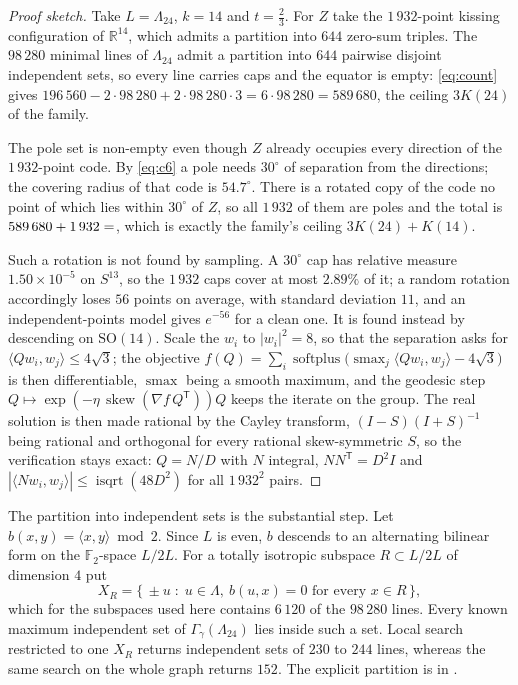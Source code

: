 \documentclass[11pt]{amsart}
\theoremstyle{remark}
\newcommand{\Leech}{\Lambda_{24}}
\newcommand{\ip}[2]{\langle #1,#2\rangle}
\newcommand{\R}{\mathbb{R}}
\begin{document}
\begin{proof}[Proof sketch]
Take $L=\Leech$, $k=14$ and $t=\tfrac23$. For $Z$ take the $1\,932$-point kissing
configuration of $\R^{14}$, which admits a partition into $644$ zero-sum triples.
The $98\,280$ minimal lines of $\Leech$ admit a partition into $644$ pairwise
disjoint independent sets, so every line carries caps and the equator is empty:
\eqref{eq:count} gives $196\,560-2\cdot98\,280+2\cdot98\,280\cdot3
=6\cdot98\,280=589\,680$, the ceiling $3K(24)$ of the family.

The pole set is non-empty even though $Z$ already occupies every direction of the
$1\,932$-point code. By \eqref{eq:c6} a pole needs $30^\circ$ of separation from
the directions; the covering radius of that code is $54.7^\circ$. There is a
rotated copy of the code no point of which lies within $30^\circ$ of $Z$, so all
$1\,932$ of them are poles and the total is $589\,680+1\,932=\Kh{38}$, which is
exactly the family's ceiling $3K(24)+K(14)$.

Such a rotation is not found by sampling. A $30^\circ$ cap has relative measure
$1.50\times10^{-5}$ on $S^{13}$, so the $1\,932$ caps cover at most $2.89\%$ of
it; a random rotation accordingly loses $56$ points on average, with standard
deviation $11$, and an independent-points model gives $e^{-56}$ for a clean one.
It is found instead by descending on $\mathrm{SO}(14)$. Scale the $w_i$ to
$|w_i|^2=8$, so that the separation asks for $\ip{Qw_i}{w_j}\le4\sqrt3$; the
objective
$f(Q)=\sum_i\operatorname{softplus}\bigl(\operatorname{smax}_j\ip{Qw_i}{w_j}
-4\sqrt3\bigr)$ is then differentiable, $\operatorname{smax}$ being a smooth
maximum, and the geodesic step
$Q\mapsto\exp(-\eta\,\operatorname{skew}(\nabla f\,Q^{\mathsf T}))Q$ keeps the
iterate on the group. The real solution is
then made rational by the Cayley transform, $(I-S)(I+S)^{-1}$ being rational and
orthogonal for every rational skew-symmetric $S$, so the verification stays
exact: $Q=N/D$ with $N$ integral, $NN^{\mathsf T}=D^2I$ and
$|\ip{Nw_i}{w_j}|\le\operatorname{isqrt}(48D^2)$ for all $1\,932^2$ pairs.
\end{proof}

The partition into independent sets is the substantial step. Let
$b(x,y)=\ip{x}{y}\bmod2$. Since $L$ is even, $b$ descends to an alternating
bilinear form on the $\mathbb F_2$-space $L/2L$. For a totally isotropic subspace
$R\subset L/2L$ of dimension $4$ put
\[
  X_R=\{\,\pm u \;:\; u\in\Lambda,\ b(u,x)=0 \text{ for every } x\in R\,\},
\]
which for the subspaces used here contains $6\,120$ of the $98\,280$ lines. Every
known maximum independent set of $\Gamma_\gamma(\Leech)$ lies inside such a set. Local search restricted to one
$X_R$ returns independent sets of $230$ to $244$ lines, whereas the same search
on the whole graph returns $152$. The explicit partition is in \cite{repo}.
\end{document}
